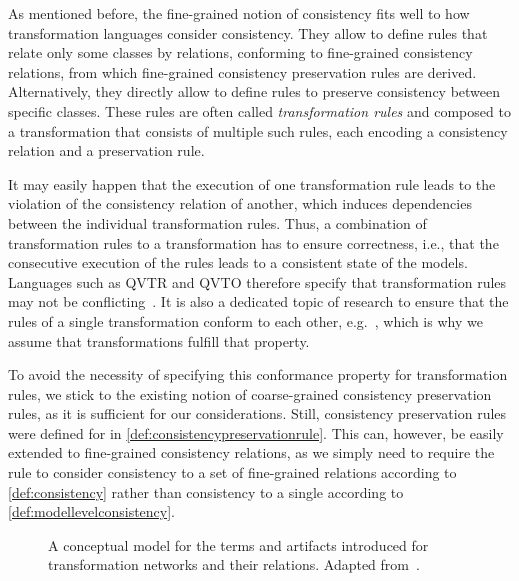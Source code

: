 As mentioned before, the fine-grained notion of consistency fits well to how transformation languages consider consistency.
They allow to define rules that relate only some classes by relations, conforming to fine-grained consistency relations, from which fine-grained consistency preservation rules are derived.
Alternatively, they directly allow to define rules to preserve consistency between specific classes.
These rules are often called \emph{transformation rules} and composed to a transformation that consists of multiple such rules, each encoding a consistency relation and a preservation rule.

It may easily happen that the execution of one transformation rule leads to the violation of the consistency relation of another, which induces dependencies between the individual transformation rules.
Thus, a combination of transformation rules to a transformation has to ensure correctness, i.e., that the consecutive execution of the rules leads to a consistent state of the models.
Languages such as \gls{QVTR} and \gls{QVTO} therefore specify that transformation rules may not be conflicting~\cite[Sec.~7.10.2.]{qvt}.
It is also a dedicated topic of research to ensure that the rules of a single transformation conform to each other, e.g.~\cite{cuadrado2017tse,cabot2010VerificationInvariants-JSS}, which is why we assume that transformations fulfill that property.

To avoid the necessity of specifying this conformance property for transformation rules, we stick to the existing notion of coarse-grained consistency preservation rules, as it is sufficient for our considerations.
Still, consistency preservation rules were defined for \modellevelconsistencyrelations in \autoref{def:consistencypreservationrule}.
This can, however, be easily extended to fine-grained consistency relations, as we simply need to require the rule to consider consistency to a set of fine-grained relations according to \autoref{def:consistency} rather than consistency to a single \modellevelconsistencyrelation according to \autoref{def:modellevelconsistency}.

\begin{figure}
    \centering
    
    \caption[Conceptual model for transformation networks]{A conceptual model for the terms and artifacts introduced for transformation networks and their relations. Adapted from~.}
    \label{fig:correctness:conceptual_model}
\end{figure}


